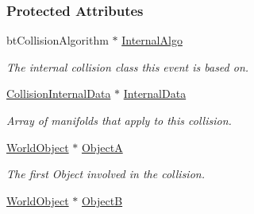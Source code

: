 \subsubsection*{Protected Attributes}
\begin{DoxyCompactItemize}
\item 
\hypertarget{classMezzanine_1_1Collision_a6326964a8f8601655d97efc231ec3f86}{
btCollisionAlgorithm $\ast$ \hyperlink{classMezzanine_1_1Collision_a6326964a8f8601655d97efc231ec3f86}{InternalAlgo}}
\label{classMezzanine_1_1Collision_a6326964a8f8601655d97efc231ec3f86}

\begin{DoxyCompactList}\small\item\em The internal collision class this event is based on. \item\end{DoxyCompactList}\item 
\hypertarget{classMezzanine_1_1Collision_ac4a67a946284d3bacbd342b935495b57}{
\hyperlink{structMezzanine_1_1CollisionInternalData}{CollisionInternalData} $\ast$ \hyperlink{classMezzanine_1_1Collision_ac4a67a946284d3bacbd342b935495b57}{InternalData}}
\label{classMezzanine_1_1Collision_ac4a67a946284d3bacbd342b935495b57}

\begin{DoxyCompactList}\small\item\em Array of manifolds that apply to this collision. \item\end{DoxyCompactList}\item 
\hypertarget{classMezzanine_1_1Collision_adda553398a86a2ed1157689e2dfebbec}{
\hyperlink{classMezzanine_1_1WorldObject}{WorldObject} $\ast$ \hyperlink{classMezzanine_1_1Collision_adda553398a86a2ed1157689e2dfebbec}{ObjectA}}
\label{classMezzanine_1_1Collision_adda553398a86a2ed1157689e2dfebbec}

\begin{DoxyCompactList}\small\item\em The first Object involved in the collision. \item\end{DoxyCompactList}\item 
\hypertarget{classMezzanine_1_1Collision_aef15617d25f42598783887f3d8cc6086}{
\hyperlink{classMezzanine_1_1WorldObject}{WorldObject} $\ast$ \hyperlink{classMezzanine_1_1Collision_aef15617d25f42598783887f3d8cc6086}{ObjectB}}
\label{classMezzanine_1_1Collision_aef15617d25f42598783887f3d8cc6086}


\end{DoxyCompactItemize}
